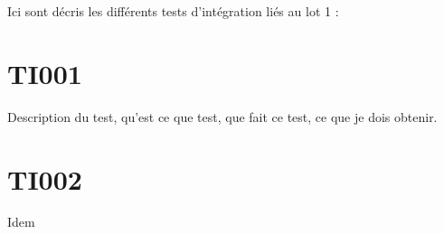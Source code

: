Ici sont décris les différents tests d'intégration liés au lot 1 :

\section{TI001}
	Description du test, qu'est ce que test, que fait ce test, ce que je dois obtenir.
	
\section{TI002}
	Idem